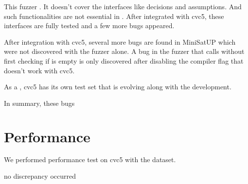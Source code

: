 This fuzzer . It doesn't cover the interfaces like decisions and assumptions. And such functionalities are not essential in . After integrated with cvc5, these interfaces are fully tested and a few more bugs appeared.


After integration with cvc5, several more bugs are found in MiniSatUP which were not discovered with the fuzzer alone. A bug in the fuzzer that calls  without first checking if  is empty is only discovered after disabling the compiler flag  that doesn't work with cvc5.

As a , cvc5 has its own test set that is evolving along with the development.


In summary, these bugs 

\section{Performance}


We performed performance test on cvc5 with the dataset.


no discrepancy occurred
